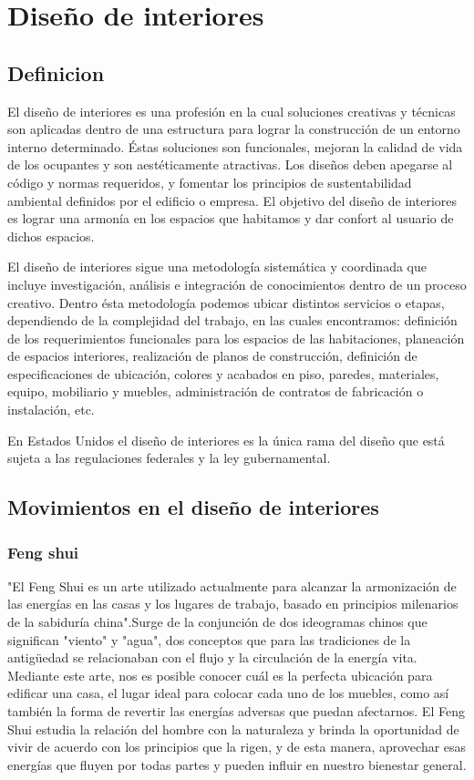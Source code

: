 \section{Diseño de interiores}
\subsection{Definicion}
El diseño de interiores es una profesión en la cual soluciones creativas y técnicas son aplicadas dentro de una estructura para lograr la construcción de un entorno interno determinado. Éstas soluciones son funcionales, mejoran la calidad de vida de los ocupantes y son aestéticamente atractivas. Los diseños deben apegarse al código y normas requeridos, y fomentar los principios de sustentabilidad ambiental definidos por el edificio o empresa. El objetivo del diseño de interiores es lograr una armonía en los espacios que habitamos y dar confort al usuario de dichos espacios\cite{B01}. \par
El diseño de interiores sigue una metodología sistemática y coordinada que incluye investigación, análisis e integración de conocimientos dentro de un proceso creativo. Dentro ésta metodología podemos ubicar distintos servicios o etapas, dependiendo de la complejidad del trabajo, en las cuales encontramos: definición de los requerimientos funcionales para los espacios de las habitaciones, planeación de espacios interiores, realización de planos de construcción, definición de especificaciones de ubicación, colores y acabados en piso, paredes, materiales, equipo, mobiliario y muebles, administración de contratos de fabricación o instalación, etc.\par
En Estados Unidos el diseño de interiores es la única rama del diseño que está sujeta a las regulaciones federales y la ley gubernamental\cite{B02}.
\subsection{Movimientos en el diseño de interiores}

\subsubsection{Feng shui}
"El Feng Shui es un arte utilizado actualmente para alcanzar la armonización de las energías en las casas y los lugares de trabajo, basado en principios milenarios de la sabiduría china"\cite{B26}.Surge de la conjunción de dos ideogramas chinos que significan "viento" y "agua", dos conceptos que para las tradiciones de la antigüedad se relacionaban con el flujo y la circulación de la energía vita. Mediante este arte, nos es posible conocer cuál es la perfecta ubicación para edificar una casa, el lugar ideal para colocar cada uno de los muebles, como así también la forma de revertir las energías adversas que puedan afectarnos. El Feng Shui estudia la relación del hombre con la naturaleza y brinda la oportunidad de vivir de acuerdo con los principios que la rigen, y de esta manera, aprovechar esas energías que fluyen por todas partes y pueden influir en nuestro bienestar general.


